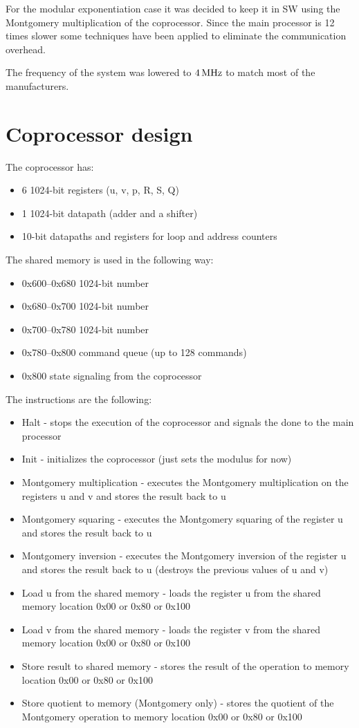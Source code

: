 For the modular exponentiation case it was decided to keep it in SW
using the Montgomery multiplication of the coprocessor. Since the main
processor is 12 times slower some techniques have been applied to
eliminate the communication overhead.

The frequency of the system was lowered to $\unit[4]{MHz}$ to match
most of the manufacturers.

\section{Coprocessor design}

The coprocessor has:
\begin{itemize}
\item 6 1024-bit registers (u, v, p, R, S, Q)
\item 1 1024-bit datapath (adder and a shifter)
\item 10-bit datapaths and registers for loop and address counters
\end{itemize}

\noindent
The shared memory is used in the following way:
\begin{itemize}
\item 0x600--0x680 1024-bit number
\item 0x680--0x700 1024-bit number
\item 0x700--0x780 1024-bit number
\item 0x780--0x800 command queue (up to 128 commands)
\item 0x800 state signaling from the coprocessor
\end{itemize}

\noindent
The instructions are the following:
\begin{itemize}
\item Halt - stops the execution of the coprocessor and signals the
  done to the main processor
\item Init - initializes the coprocessor (just sets the modulus for now)
\item Montgomery multiplication - executes the Montgomery
  multiplication on the registers u and v and stores the result back
  to u
\item Montgomery squaring - executes the Montgomery squaring of the
  register u and stores the result back to u
\item Montgomery inversion - executes the Montgomery inversion of the
  register u and stores the result back to u (destroys the previous
  values of u and v)
\item Load u from the shared memory - loads the register u from the
  shared memory location 0x00 or 0x80 or 0x100
\item Load v from the shared memory - loads the register v from the
  shared memory location 0x00 or 0x80 or 0x100
\item Store result to shared memory - stores the result of the
  operation to memory location 0x00 or 0x80 or 0x100
\item Store quotient to memory (Montgomery only) - stores the quotient
  of the Montgomery operation to memory location 0x00 or 0x80 or 0x100
\end{itemize}

